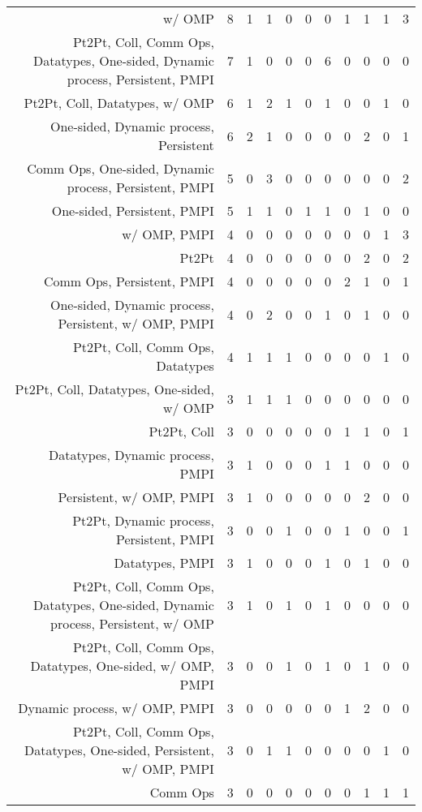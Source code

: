 {\begin{landscape}
\begin{longtable}[htb]{r|c|c|c|c|c|c|c|c|c|c}
{w/ OMP} & 8 & 1 & 1 & 0 & 0 & 0 & 1 & 1 & 1 & 3 \\%
{Pt2Pt, Coll, Comm Ops, Datatypes, One-sided, Dynamic process, Persistent, PMPI} & 7 & 1 & 0 & 0 & 0 & 6 & 0 & 0 & 0 & 0 \\%
{Pt2Pt, Coll, Datatypes, w/ OMP} & 6 & 1 & 2 & 1 & 0 & 1 & 0 & 0 & 1 & 0 \\%
{One-sided, Dynamic process, Persistent} & 6 & 2 & 1 & 0 & 0 & 0 & 0 & 2 & 0 & 1 \\%
{Comm Ops, One-sided, Dynamic process, Persistent, PMPI} & 5 & 0 & 3 & 0 & 0 & 0 & 0 & 0 & 0 & 2 \\%
{One-sided, Persistent, PMPI} & 5 & 1 & 1 & 0 & 1 & 1 & 0 & 1 & 0 & 0 \\%
{w/ OMP, PMPI} & 4 & 0 & 0 & 0 & 0 & 0 & 0 & 0 & 1 & 3 \\%
{Pt2Pt} & 4 & 0 & 0 & 0 & 0 & 0 & 0 & 2 & 0 & 2 \\%
{Comm Ops, Persistent, PMPI} & 4 & 0 & 0 & 0 & 0 & 0 & 2 & 1 & 0 & 1 \\%
{One-sided, Dynamic process, Persistent, w/ OMP, PMPI} & 4 & 0 & 2 & 0 & 0 & 1 & 0 & 1 & 0 & 0 \\%
{Pt2Pt, Coll, Comm Ops, Datatypes} & 4 & 1 & 1 & 1 & 0 & 0 & 0 & 0 & 1 & 0 \\%
{Pt2Pt, Coll, Datatypes, One-sided, w/ OMP} & 3 & 1 & 1 & 1 & 0 & 0 & 0 & 0 & 0 & 0 \\%
{Pt2Pt, Coll} & 3 & 0 & 0 & 0 & 0 & 0 & 1 & 1 & 0 & 1 \\%
{Datatypes, Dynamic process, PMPI} & 3 & 1 & 0 & 0 & 0 & 1 & 1 & 0 & 0 & 0 \\%
{Persistent, w/ OMP, PMPI} & 3 & 1 & 0 & 0 & 0 & 0 & 0 & 2 & 0 & 0 \\%
{Pt2Pt, Dynamic process, Persistent, PMPI} & 3 & 0 & 0 & 1 & 0 & 0 & 1 & 0 & 0 & 1 \\%
{Datatypes, PMPI} & 3 & 1 & 0 & 0 & 0 & 1 & 0 & 1 & 0 & 0 \\%
{Pt2Pt, Coll, Comm Ops, Datatypes, One-sided, Dynamic process, Persistent, w/ OMP} & 3 & 1 & 0 & 1 & 0 & 1 & 0 & 0 & 0 & 0 \\%
{Pt2Pt, Coll, Comm Ops, Datatypes, One-sided, w/ OMP, PMPI} & 3 & 0 & 0 & 1 & 0 & 1 & 0 & 1 & 0 & 0 \\%
{Dynamic process, w/ OMP, PMPI} & 3 & 0 & 0 & 0 & 0 & 0 & 1 & 2 & 0 & 0 \\%
{Pt2Pt, Coll, Comm Ops, Datatypes, One-sided, Persistent, w/ OMP, PMPI} & 3 & 0 & 1 & 1 & 0 & 0 & 0 & 0 & 1 & 0 \\%
{Comm Ops} & 3 & 0 & 0 & 0 & 0 & 0 & 0 & 1 & 1 & 1 \\%

\end{longtable}
\end{landscape}}
